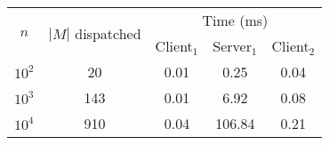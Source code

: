 \begin{tabular}{rcccc}
    \toprule
    \multicolumn{1}{c}{\multirow{2}{*}{$n$}} &
    \multicolumn{1}{c}{\multirow{2}{*}{$|M|$ dispatched}} &
    \multicolumn{3}{c}{Time (ms)} \\

    \cmidrule{3-5}
    & & Client$_1$ & Server$_1$ & Client$_2$ \\
    \cmidrule{1-5}
    $10^2$ & 20 & 0.01 & 0.25 & 0.04 \\
    $10^3$ & 143 & 0.01 & 6.92 & 0.08 \\
    $10^4$ & 910 & 0.04 & 106.84 & 0.21 \\

    \bottomrule
\end{tabular}